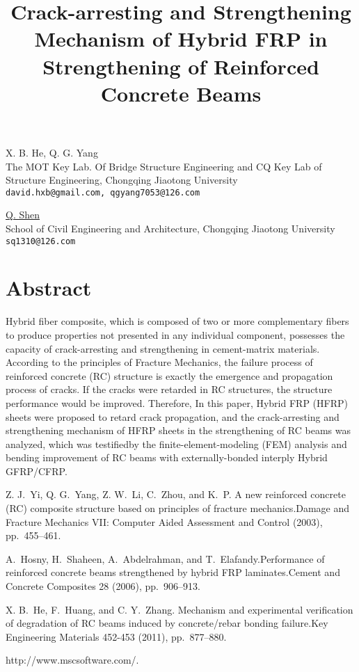 \title{Crack-arresting and Strengthening Mechanism of Hybrid FRP in Strengthening of Reinforced Concrete Beams}
\author{} \institute{}
\maketitle

\begin{center}
{\large X. B. He, Q. G. Yang}\\
The MOT Key Lab. Of Bridge Structure Engineering and CQ Key Lab of Structure Engineering, Chongqing Jiaotong University\\
{\tt david.hxb@gmail.com, qgyang7053@126.com}\\
\vspace{4mm}

{\large \underline{Q. Shen}}\\
School of Civil Engineering and Architecture, Chongqing Jiaotong University\\
{\tt sq1310@126.com}
\end{center}

\section*{Abstract}
Hybrid fiber composite, which is composed of two or more complementary fibers to produce properties not presented in any individual component, possesses the capacity of crack-arresting and strengthening in cement-matrix materials. According to the principles of Fracture Mechanics, the failure process of reinforced concrete (RC) structure is exactly the emergence and propagation process of cracks. If the cracks were retarded in RC structures, the structure performance would be improved. Therefore, In this paper, Hybrid FRP (HFRP) sheets were proposed to retard crack propagation, and the crack-arresting and strengthening mechanism of HFRP sheets in the strengthening of RC beams was analyzed, which was testifiedby the finite-element-modeling (FEM) analysis and bending improvement of RC beams with externally-bonded interply Hybrid GFRP/CFRP.


\begin{thebibliography}{10}
{\sc Z. J.~Yi, Q. G.~Yang, Z. W.~Li, C.~Zhou, and K.~P}. {A new reinforced concrete (RC) composite structure based on principles of fracture mechanics}.Damage and Fracture Mechanics VII: Computer Aided Assessment and Control (2003), pp.~455--461.

{\sc A.~Hosny, H.~Shaheen, A.~Abdelrahman, and T.~Elafandy}.{Performance of reinforced concrete beams strengthened by hybrid FRP laminates}.Cement and Concrete Composites 28 (2006), pp.~906--913.

{\sc X. B.~He, F.~Huang, and C. Y.~Zhang}. {Mechanism and experimental verification of degradation of RC beams induced by concrete/rebar bonding failure}.Key Engineering Materials 452-453 (2011), pp.~877--880.

\newblock http://www.mscsoftware.com/.
\end{thebibliography}